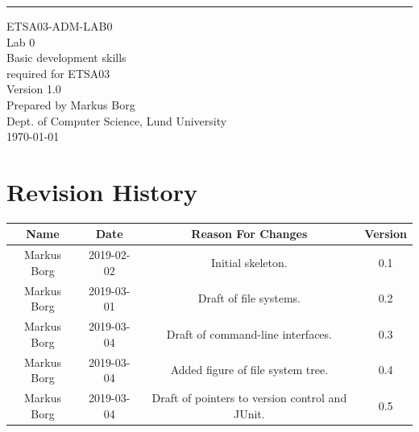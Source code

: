 \documentclass{scrreprt}
\date{}
\def\myversion{1.0 }
\begin{document}
\begin{flushright}
    \rule{16cm}{5pt}\vskip1cm
    \begin{bfseries}
    	\LARGE{ETSA03-ADM-LAB0}\\
    	\vspace{1.5cm}
        \Huge{Lab 0}\\
        \vspace{0.5cm}
        Basic development skills\\
        \vspace{0.5cm}
        required for ETSA03\\
        \vspace{1.5cm}
        \LARGE{Version \myversion}\\
        \vspace{1.5cm}
        Prepared by Markus Borg\\
        Dept. of Computer Science, Lund University\\
        \vspace{1.5cm}
        \today\\
    \end{bfseries}
\end{flushright}


\chapter*{Revision History}

\begin{center}
    \begin{tabular}{|c|c|c|c|}
        \hline
	    Name & Date & Reason For Changes & Version\\
        \hline
	    Markus Borg & 2019-02-02 & Initial skeleton. & 0.1\\
        \hline
        Markus Borg & 2019-03-01 & Draft of file systems. & 0.2\\
        \hline
        Markus Borg & 2019-03-04 & Draft of command-line interfaces. & 0.3\\
        \hline
        Markus Borg & 2019-03-04 & Added figure of file system tree. & 0.4\\
        \hline
        Markus Borg & 2019-03-04 & Draft of pointers to version control and JUnit. & 0.5\\
        \hline
    \end{tabular}
\end{center}
\end{document}
